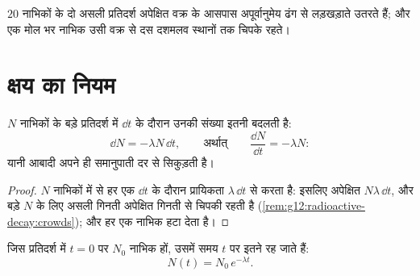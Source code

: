 \begin{omfigure}

{\small $20$ नाभिकों के दो असली प्रतिदर्श अपेक्षित वक्र के आसपास
अपूर्वानुमेय ढंग से लड़खड़ाते उतरते हैं; और एक मोल भर नाभिक उसी वक्र से दस
दशमलव स्थानों तक चिपके रहते।}
\end{omfigure}

\section{क्षय का नियम}

\begin{proposition}[विकास-समीकरण]\label{prop:g12:radioactive-decay:ode}
$N$ नाभिकों के बड़े प्रतिदर्श में $\dd t$ के दौरान उनकी संख्या इतनी बदलती है:
\[
\dd N = -\lambda N\,\dd t, \qquad\text{अर्थात्}\qquad \frac{\dd N}{\dd t} = -\lambda N :
\]
यानी आबादी अपने ही समानुपाती दर से सिकुड़ती है।
\end{proposition}

\begin{proof}
$N$ नाभिकों में से हर एक $\dd t$ के दौरान प्रायिकता $\lambda\,\dd t$ से  करता है:
इसलिए अपेक्षित  $N\lambda\,\dd t$, और बड़े $N$ के लिए असली गिनती अपेक्षित गिनती से
चिपकी रहती है (\cref{rem:g12:radioactive-decay:crowds}); और हर  एक नाभिक हटा देता है।
\end{proof}

\begin{theorem}[रेडियोसक्रिय क्षय का नियम]\label{thm:g12:radioactive-decay:law}
जिस प्रतिदर्श में $t = 0$ पर $N_0$ नाभिक हों, उसमें समय $t$ पर इतने रह जाते
हैं:
\[
N(t) = N_0 \, e^{-\lambda t}.
\]
\end{theorem}


